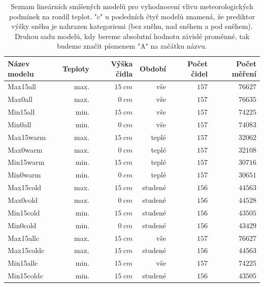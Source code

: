\begin{table}
\centering\footnotesize\sf
\begin{tabular}{lrrrrr}
\toprule
	Název modelu & Teploty & Výška čidla & Období & Počet čidel & Počet měření \\
\midrule
	Max15all & max. & $\SI{15}{cm}$ & vše & $157$ & $76627$ \\
	Max0all & max. & $\SI{0}{cm}$ & vše & $157$ & $76635$ \\
	Min15all & min. & $\SI{15}{cm}$ & vše & $157$ & $74225$ \\
	Min0all & min. & $\SI{0}{cm}$ & vše & $157$ & $74083$ \\
	Max15warm & max. & $\SI{15}{cm}$ & teplé & $157$ & $32062$ \\
	Max0warm & max. & $\SI{0}{cm}$ & teplé & $157$ & $32108$ \\
	Min15warm & min. & $\SI{15}{cm}$ & teplé & $157$ & $30716$ \\
	Min0warm & min. & $\SI{0}{cm}$ & teplé & $157$ & $30651$ \\
	Max15cold & max. & $\SI{15}{cm}$ & studené & $156$ & $44563$ \\
	Max0cold & max. & $\SI{0}{cm}$ & studené & $156$ & $44528$ \\
	Min15cold & min. & $\SI{15}{cm}$ & studené & $156$ & $43505$ \\
	Min0cold & min. & $\SI{0}{cm}$ & studené & $156$ & $43429$ \\
	Max15allc & max. & $\SI{15}{cm}$ & vše & $157$ & $76627$ \\
	Max15coldc & max. & $\SI{15}{cm}$ & studené & $156$ & $44563$ \\
	Min15allc & min. & $\SI{15}{cm}$ & vše & $157$ & $74225$ \\
	Min15coldc & min. & $\SI{15}{cm}$ & studené & $156$ & $43505$ \\
\bottomrule
\end{tabular}
	\caption{Seznam lineárních smíšených modelů pro vyhodnocení vlivu meteorologických podmínek na rozdíl teplot. "c" u posledních čtyř modelů znamená, že prediktor výšky sněhu je nahrazen kategoriemi (bez sněhu, nad sněhem a pod sněhem). Druhou sadu modelů, kdy bereme absolutní hodnotu závislé proměnné, tak budeme značit písmenem "A" na začátku názvu.}
	\label{tab:seznammodelu}
\end{table}

